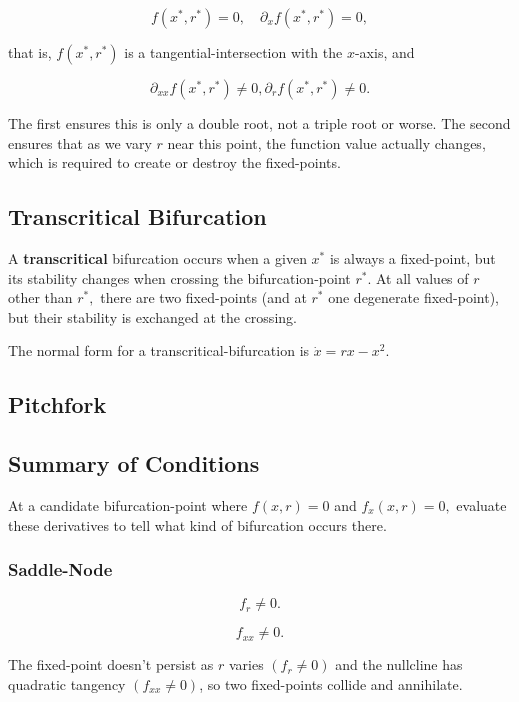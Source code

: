 \documentclass{article}
\begin{document}
\[ f(x^*, r^*) = 0, \quad \partial_x f(x^*, r^*) = 0, \]

that is, $f(x^*, r^*)$ is a \@{tangential-intersection} with the $x$-axis, and

\[ \partial_{xx} f(x^*, r^*) \neq 0, \partial_r f(x^*, r^*) \neq 0. \]

The first ensures this is only a double root, not a triple root or worse. The second ensures that as we vary $r$ near this point, the function value actually changes, which is required to create or destroy the \@{fixed-points}.

\subsection{Transcritical Bifurcation}

\begin{definition}[Transcritical]
A \textbf{transcritical} \@{bifurcation} occurs when a given $x^*$ is always a \@{fixed-point}, but its stability changes when crossing the \@{bifurcation-point} $r^*$. At all values of $r$ other than $r^*,$ there are two \@{fixed-points} (and at $r^*$ one degenerate \@{fixed-point}), but their stability is exchanged at the crossing.
\end{definition}

The normal form for a \@{transcritical-bifurcation} is $\dot{x} = r x - x^2.$

\subsection{Pitchfork}

\subsection{Summary of Conditions}

At a candidate \@{bifurcation-point} where $f(x,r) = 0$ and $f_x(x,r) = 0,$ evaluate these derivatives to tell what kind of \@{bifurcation} occurs there.

\subsubsection{Saddle-Node}

\[ f_r \neq 0. \]

\[ f_{xx} \neq 0. \]

\begin{intuition}
The \@{fixed-point} doesn't persist as $r$ varies $(f_r \neq 0)$ and the \@{nullcline} has quadratic tangency $(f_{xx} \neq 0)$, so two \@{fixed-points} collide and annihilate.
\end{intuition}
\end{document}
